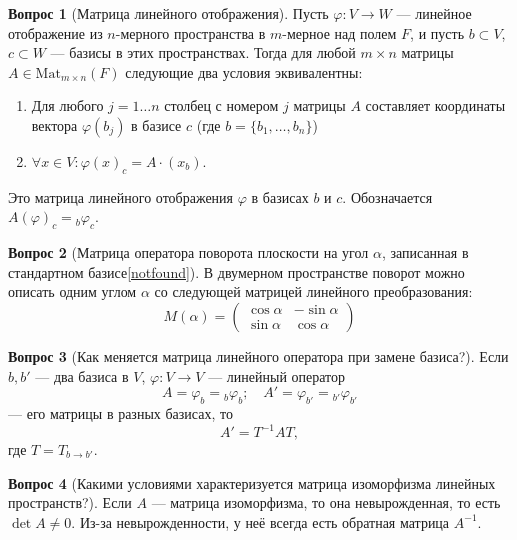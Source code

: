 \documentclass[a4paper,11pt]{article}
\theoremstyle{remark}
\theoremstyle{definition}
\newtheorem{question}{Вопрос}
\begin{document}
\begin{question}[Матрица линейного отображения]
Пусть \(\varphi: V \rightarrow W\) --- линейное отображение из \(n\)-мерного пространства в \(m\)-мерное над полем \(F\), и пусть \(b \subset V\), \(c \subset W\) --- базисы в этих пространствах. Тогда для любой \(m \times n\) матрицы \(A \in \mathrm{Mat}_{m \times n}(F)\) следующие два условия эквивалентны:
\begin{enumerate}
	\item Для любого \(j = 1 \dots n\) столбец с номером \(j\) матрицы \(A\) составляет координаты вектора \(\varphi(b_j)\) в базисе \(c\) (где \(b = \{b_1, \dots, b_n\}\))
	\item \(\forall x \in V\!: \varphi(x)_c = A \cdot (x_b)\).
\end{enumerate}
Это матрица линейного отображения \(\varphi\) в базисах \(b\) и \(c\). Обозначается \(A(\varphi)_c = {}_b\varphi_c\).
\end{question}


\begin{question}[Матрица оператора поворота плоскости на угол \(\alpha{}\), записанная в стандартном базисе\cref{notfound}]
В двумерном пространстве поворот можно описать одним углом \(\alpha\) со следующей матрицей линейного преобразования:
\begin{equation*}
	M(\alpha) =
	\begin{pmatrix}
		\cos \alpha & -\sin \alpha \\
		\sin \alpha & \cos \alpha
	\end{pmatrix}
\end{equation*}
\end{question}


\begin{question}[Как меняется матрица линейного оператора при замене базиса?]
Если \(b, b'\) --- два базиса в \(V\), \(\varphi: V \rightarrow V\) --- линейный оператор
\begin{equation*}
	A = \varphi_b = {}_b\varphi_b; \quad A' = \varphi_{b'} = {}_{b'}\varphi_{b'}
\end{equation*}
--- его матрицы в разных базисах, то
\begin{equation*}
	A' = T^{-1}AT,
\end{equation*}
где \(T = T_{b \rightarrow b'}\).
\end{question}


\begin{question}[Какими условиями характеризуется матрица изоморфизма линейных пространств?]
Если \(A\) --- матрица изоморфизма, то она невырожденная, то есть \(\det A \neq 0\). Из-за невырожденности, у неё всегда есть обратная матрица \(A^{-1}\).
\end{question}
\end{document}
